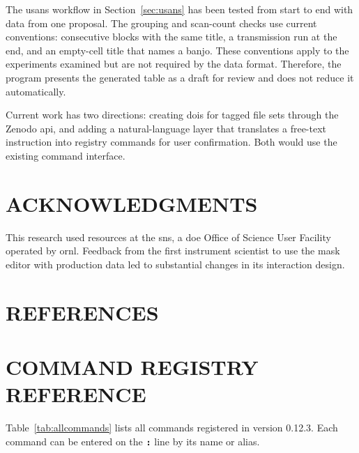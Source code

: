 \documentclass[tm]{ornltm}
\newcommand{\key}[1]{\textbf{\texttt{#1}}}
\begin{document}
The \ac{usans} workflow in Section~\ref{sec:usans} has been tested from start to
end with data from one proposal. The grouping and scan-count checks use current
conventions: consecutive blocks with the same title, a transmission run at the
end, and an empty-cell title that names a banjo. These conventions apply to the
experiments examined but are not required by the data format. Therefore, the
program presents the generated table as a draft for review and does not reduce
it automatically.

Current work has two directions: creating \acp{doi} for tagged file sets through
the Zenodo \ac{api}, and adding a natural-language layer that translates a
free-text instruction into registry commands for user confirmation. Both would
use the existing command interface.

\section*{ACKNOWLEDGMENTS}

This research used resources at the \ac{sns}, a \ac{doe} Office of Science User
Facility operated by \ac{ornl}. Feedback from the first instrument scientist to
use the mask editor with production data led to substantial changes in its
interaction design.

\section{REFERENCES}
\printbibliography[heading=none]

\appendix
\acresetall

\section{COMMAND REGISTRY REFERENCE}
\label{sec:appcommands}

Table~\ref{tab:allcommands} lists all commands registered in version 0.12.3.
Each command can be entered on the \key{:} line by its name or alias.
\end{document}

